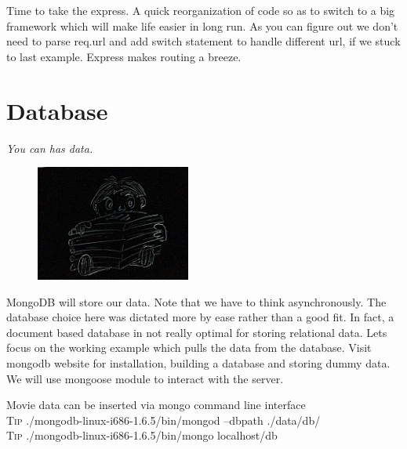 \documentclass[12pt]{book}
\begin{document}
Time to take the express. A quick reorganization of code so as to switch to a big framework which will make life easier in long run. As you can figure out we don't need to parse req.url and add switch statement to handle different url, if we stuck to last example. Express makes routing a breeze.

\vspace{0.6cm}\vspace{0.6cm}



\chapter{Database}
\begin{flushright}\textit{You can has data.}\end{flushright}

\begin{figure}
\begin{center}\includegraphics[width=2in]{org/art/dataStorage.png}\end{center}
\end{figure}

MongoDB will store our data. Note that we have to think asynchronously. The database choice here was dictated more by ease rather than a good fit. In fact, a document based database in not really optimal for storing relational data.
Lets focus on the working example which pulls the data from the database. Visit mongodb website for installation, building a database and storing dummy data. We will use mongoose module to interact with the server.

\vspace{0.6cm}\vspace{0.6cm}

Movie data can be inserted via mongo command line interface \\
\colorbox{tipcolour}{\tiny \textsc{Tip} \small ./mongodb-linux-i686-1.6.5/bin/mongod --dbpath ./data/db/ } \\
\colorbox{tipcolour}{\tiny \textsc{Tip} \small ./mongodb-linux-i686-1.6.5/bin/mongo localhost/db } \\
\par
\end{document}
